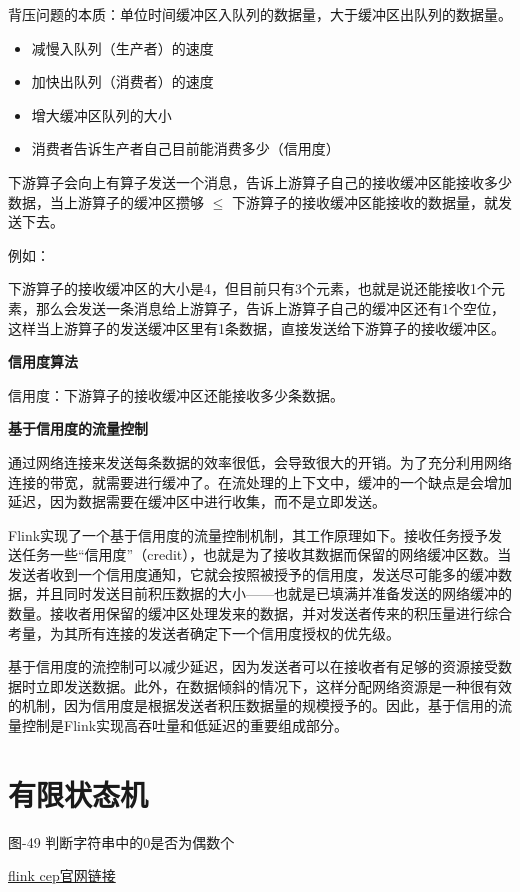 背压问题的本质：单位时间缓冲区入队列的数据量，大于缓冲区出队列的数据量。

\begin{itemize}
\tightlist
\item
  减慢入队列（生产者）的速度
\item
  加快出队列（消费者）的速度
\item
  增大缓冲区队列的大小
\item
  消费者告诉生产者自己目前能消费多少（信用度）
\end{itemize}

下游算子会向上有算子发送一个消息，告诉上游算子自己的接收缓冲区能接收多少数据，当上游算子的缓冲区攒够
\(\le\) 下游算子的接收缓冲区能接收的数据量，就发送下去。

例如：

下游算子的接收缓冲区的大小是4，但目前只有3个元素，也就是说还能接收1个元素，那么会发送一条消息给上游算子，告诉上游算子自己的缓冲区还有1个空位，这样当上游算子的发送缓冲区里有1条数据，直接发送给下游算子的接收缓冲区。

\textbf{信用度算法}

信用度：下游算子的接收缓冲区还能接收多少条数据。

\textbf{基于信用度的流量控制}

通过网络连接来发送每条数据的效率很低，会导致很大的开销。为了充分利用网络连接的带宽，就需要进行缓冲了。在流处理的上下文中，缓冲的一个缺点是会增加延迟，因为数据需要在缓冲区中进行收集，而不是立即发送。

Flink实现了一个基于信用度的流量控制机制，其工作原理如下。接收任务授予发送任务一些``信用度''（credit），也就是为了接收其数据而保留的网络缓冲区数。当发送者收到一个信用度通知，它就会按照被授予的信用度，发送尽可能多的缓冲数据，并且同时发送目前积压数据的大小------也就是已填满并准备发送的网络缓冲的数量。接收者用保留的缓冲区处理发来的数据，并对发送者传来的积压量进行综合考量，为其所有连接的发送者确定下一个信用度授权的优先级。

基于信用度的流控制可以减少延迟，因为发送者可以在接收者有足够的资源接受数据时立即发送数据。此外，在数据倾斜的情况下，这样分配网络资源是一种很有效的机制，因为信用度是根据发送者积压数据量的规模授予的。因此，基于信用的流量控制是Flink实现高吞吐量和低延迟的重要组成部分。

\hypertarget{ux6709ux9650ux72b6ux6001ux673a}{%
\section{有限状态机}\label{ux6709ux9650ux72b6ux6001ux673a}}

图-49 判断字符串中的0是否为偶数个

\href{https://nightlies.apache.org/flink/flink-docs-master/zh/docs/libs/cep/}{flink
cep官网链接}
